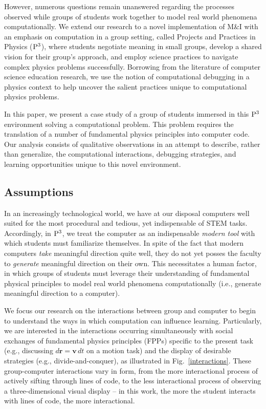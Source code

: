 \documentclass{msuphddissertation}
\begin{document}
\begin{doublespace}
However, numerous questions remain unanswered regarding the processes observed while groups of students work together to model real world phenomena computationally.  We extend our research to a novel implementation of M\&I with an emphasis on computation in a group setting, called Projects and Practices in Physics (${\rm P}^{3}$), where students negotiate meaning in small groups, develop a shared vision for their group's approach, and employ science practices to navigate complex physics problems successfully.  Borrowing from the literature of computer science education research,\cite{McCauley2008} we use the notion of computational debugging in a physics context to help uncover the salient practices unique to computational physics problems.

In this paper, we present a case study of a group of students immersed in this ${\rm P}^{3}$ environment solving a computational problem.  This problem requires the translation of a number of fundamental physics principles into computer code.  Our analysis consists of qualitative observations in an attempt to describe, rather than generalize, the computational interactions, debugging strategies, and learning opportunities unique to this novel environment.

\subsection{Assumptions}

In an increasingly technological world, we have at our disposal computers well suited for the most procedural and tedious, yet indispensable of STEM tasks.  Accordingly, in ${\rm P}^{3}$, we treat the computer as an indispensable \emph{modern tool} with which students must familiarize themselves.  In spite of the fact that modern computers \emph{take} meaningful direction quite well, they do not yet posses the faculty to \emph{generate} meaningful direction on their own.  This necessitates a human factor, in which groups of students must leverage their understanding of fundamental physical principles to model real world phenomena computationally (i.e., generate meaningful direction to a computer).

We focus our research on the interactions between group and computer to begin to understand the ways in which computation can influence learning.  Particularly, we are interested in the interactions occurring simultaneously with social exchanges of fundamental physics principles (FPPs) specific to the present task (e.g., discussing $d\mathbf{r}=\mathbf{v}\,dt$ on a motion task) and the display of desirable strategies (e.g., divide-and-conquer), as illustrated in Fig.~\ref{interactions}.  These group-computer interactions vary in form, from the more interactional process of actively sifting through lines of code, to the less interactional process of observing a three-dimensional visual display -- in this work, the more the student interacts with lines of code, the more interactional.


\end{doublespace}
\end{document}
